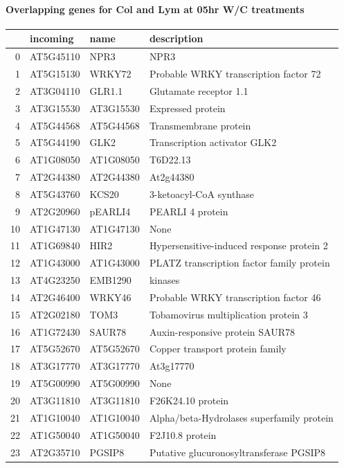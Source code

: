 \documentclass[11pt]{article}
\begin{document}
\paragraph{Overlapping genes for Col and Lym at 05hr W/C treatments}
\label{sec:org3459087}
\begin{center}
\begin{tabular}{rlll}
 & incoming & name & description\\
\hline
0 & AT5G45110 & NPR3 & NPR3\\
1 & AT5G15130 & WRKY72 & Probable WRKY transcription factor 72\\
2 & AT3G04110 & GLR1.1 & Glutamate receptor 1.1\\
3 & AT3G15530 & AT3G15530 & Expressed protein\\
4 & AT5G44568 & AT5G44568 & Transmembrane protein\\
5 & AT5G44190 & GLK2 & Transcription activator GLK2\\
6 & AT1G08050 & AT1G08050 & T6D22.13\\
7 & AT2G44380 & AT2G44380 & At2g44380\\
8 & AT5G43760 & KCS20 & 3-ketoacyl-CoA synthase\\
9 & AT2G20960 & pEARLI4 & PEARLI 4 protein\\
10 & AT1G47130 & AT1G47130 & None\\
11 & AT1G69840 & HIR2 & Hypersensitive-induced response protein 2\\
12 & AT1G43000 & AT1G43000 & PLATZ transcription factor family protein\\
13 & AT4G23250 & EMB1290 & kinases\\
14 & AT2G46400 & WRKY46 & Probable WRKY transcription factor 46\\
15 & AT2G02180 & TOM3 & Tobamovirus multiplication protein 3\\
16 & AT1G72430 & SAUR78 & Auxin-responsive protein SAUR78\\
17 & AT5G52670 & AT5G52670 & Copper transport protein family\\
18 & AT3G17770 & AT3G17770 & At3g17770\\
19 & AT5G00990 & AT5G00990 & None\\
20 & AT3G11810 & AT3G11810 & F26K24.10 protein\\
21 & AT1G10040 & AT1G10040 & Alpha/beta-Hydrolases superfamily protein\\
22 & AT1G50040 & AT1G50040 & F2J10.8 protein\\
23 & AT2G35710 & PGSIP8 & Putative glucuronosyltransferase PGSIP8\\

\end{tabular}
\end{center}
\end{document}
